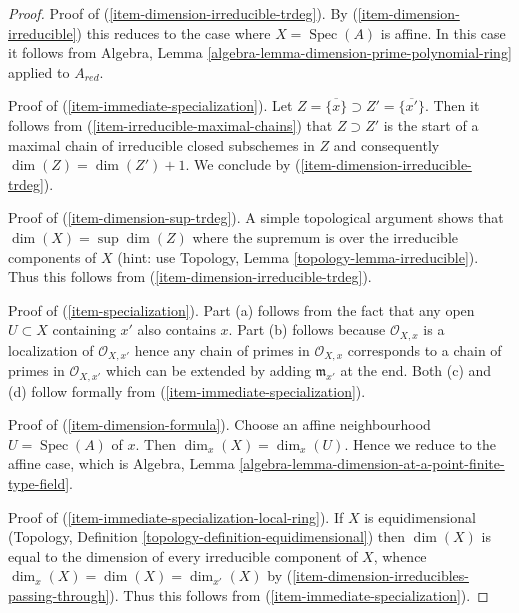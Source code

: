 \documentclass[10pt,a4paper]{amsart}
\theoremstyle{plain}
\theoremstyle{definition}
\theoremstyle{remark}
\numberwithin{equation}{subsection}
\def\Spec{\mathop{\mathrm{Spec}}}
\begin{document}
\begin{proof}
\medskip\noindent
Proof of (\ref{item-dimension-irreducible-trdeg}). By
(\ref{item-dimension-irreducible}) this reduces to the case where
$X = \Spec(A)$ is affine. In this case it follows from
Algebra, Lemma \ref{algebra-lemma-dimension-prime-polynomial-ring}
applied to $A_{red}$.

\medskip\noindent
Proof of (\ref{item-immediate-specialization}).
Let $Z = \overline{\{x\}} \supset Z' = \overline{\{x'\}}$.
Then it follows from (\ref{item-irreducible-maximal-chains}) that
$Z \supset Z'$ is the start of a maximal chain of
irreducible closed subschemes in $Z$
and consequently $\dim(Z) = \dim(Z') + 1$.
We conclude by (\ref{item-dimension-irreducible-trdeg}).

\medskip\noindent
Proof of (\ref{item-dimension-sup-trdeg}). A simple topological argument
shows that $\dim(X) = \sup \dim(Z)$ where the supremum is over the
irreducible components of $X$ (hint: use
Topology, Lemma \ref{topology-lemma-irreducible}).
Thus this follows from (\ref{item-dimension-irreducible-trdeg}).

\medskip\noindent
Proof of (\ref{item-specialization}). Part (a) follows from the
fact that any open $U \subset X$ containing $x'$ also contains $x$.
Part (b) follows because $\mathcal{O}_{X, x}$ is a localization of
$\mathcal{O}_{X, x'}$ hence any chain of primes in $\mathcal{O}_{X, x}$
corresponds to a chain of primes in $\mathcal{O}_{X, x'}$ which can
be extended by adding $\mathfrak m_{x'}$ at the end.
Both (c) and (d) follow formally from (\ref{item-immediate-specialization}).

\medskip\noindent
Proof of (\ref{item-dimension-formula}). Choose an affine
neighbourhood $U = \Spec(A)$ of $x$. Then $\dim_x(X) = \dim_x(U)$.
Hence we reduce to the affine case, which is
Algebra, Lemma \ref{algebra-lemma-dimension-at-a-point-finite-type-field}.

\medskip\noindent
Proof of (\ref{item-immediate-specialization-local-ring}).
If $X$ is equidimensional
(Topology, Definition \ref{topology-definition-equidimensional})
then $\dim(X)$ is equal to the dimension of every irreducible
component of $X$, whence $\dim_x(X) = \dim(X) = \dim_{x'}(X)$
by (\ref{item-dimension-irreducibles-passing-through}).
Thus this follows from (\ref{item-immediate-specialization}).
\end{proof}
\end{document}
